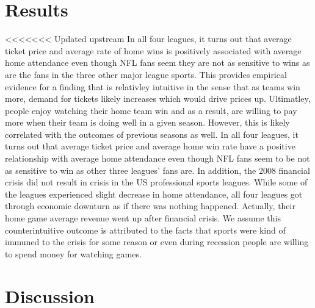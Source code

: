 \documentclass[man, fleqn, noextraspace,floatsintext]{apa6}
\begin{document}
\hypertarget{results}{%
\section{Results}\label{results}}

\textless{}\textless{}\textless{}\textless{}\textless{}\textless{}\textless{} Updated upstream
In all four leagues, it turns out that average ticket price and average rate of home wins is positively associated with average home attendance even though NFL fans seem they are not as sensitive to wins as are the fans in the three other major league sports. This provides empirical evidence for a finding that is relativley intuitive in the sense that as teams win more, demand for tickets likely increases which would drive prices up. Ultimatley, people enjoy watching their home team win and as a result, are willing to pay more when their team is doing well in a given season. However, this is likely correlated with the outcomes of previous seasons as well.
In all four leagues, it turns out that average ticket price and average home win rate have a positive relationship with average home attendance even though NFL fans seem to be not as sensitive to win as other three leagues' fans are. In addition, the 2008 financial crisis did not result in crisis in the US professional sports leagues. While some of the leagues experienced slight decrease in home attendance, all four leagues got through economic downturn as if there was nothing happened. Actually, their home game average revenue went up after financial crisis. We assume this counterintuitive outcome is attributed to the facts that sports were kind of immuned to the crisis for some reason or even during recession people are willing to spend money for watching games.

\hypertarget{discussion}{%
\section{Discussion}\label{discussion}}
\end{document}
